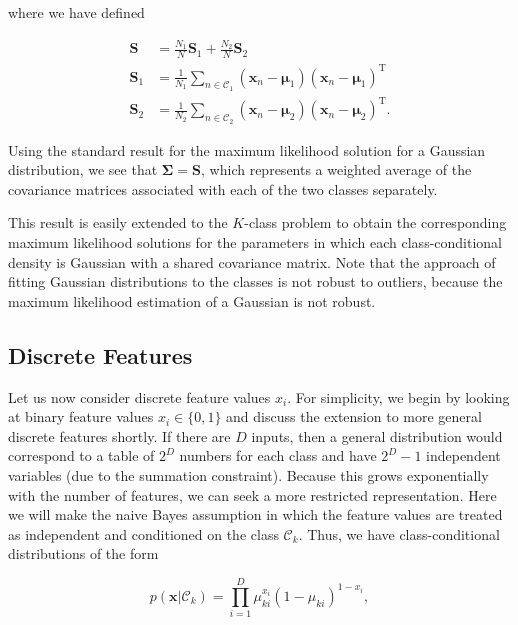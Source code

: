 \documentclass{article}
\begin{document}
where we have defined

\begin{align}
\mathbf{S} &= \frac{N_{1}}{N}\mathbf{S}_{1}+\frac{N_{2}}{N}\mathbf{S}_{2} \tag{5.61}\\ 
\mathbf{S}_{1} &= \frac{1}{N_{1}}\sum_{n\in\mathcal{C}_{1}}(\mathbf{x}_{n}-\boldsymbol{\mu}_{1})(\mathbf{x}_{n}-\boldsymbol{\mu}_{1})^{\mathrm{T}} \tag{5.62}\\ 
\mathbf{S}_{2} &= \frac{1}{N_{2}}\sum_{n\in\mathcal{C}_{2}}(\mathbf{x}_{n}-\boldsymbol{\mu}_{2})(\mathbf{x}_{n}-\boldsymbol{\mu}_{2})^{\mathrm{T}}. \tag{5.63}
\end{align}

Using the standard result for the maximum likelihood solution for a Gaussian distribution, we see that $\boldsymbol{\Sigma}=\mathbf{S}$, which represents a weighted average of the covariance matrices associated with each of the two classes separately.

This result is easily extended to the $K$-class problem to obtain the corresponding maximum likelihood solutions for the parameters in which each class-conditional density is Gaussian with a shared covariance matrix. Note that the approach of fitting Gaussian distributions to the classes is not robust to outliers, because the maximum likelihood estimation of a Gaussian is not robust.

\subsection{Discrete Features}

Let us now consider discrete feature values $x_{i}$. For simplicity, we begin by looking at binary feature values $x_{i}\in\{0,1\}$ and discuss the extension to more general discrete features shortly. If there are $D$ inputs, then a general distribution would correspond to a table of $2^{D}$ numbers for each class and have $2^{D}-1$ independent variables (due to the summation constraint). Because this grows exponentially with the number of features, we can seek a more restricted representation. Here we will make the naive Bayes assumption in which the feature values are treated as independent and conditioned on the class $\mathcal{C}_{k}$. Thus, we have class-conditional distributions of the form

\begin{equation}
p(\mathbf{x}|\mathcal{C}_{k})=\prod_{i=1}^{D}\mu_{ki}^{x_{i}}(1-\mu_{ki})^{1-x_{i}},
\tag{5.64}
\end{equation}
\end{document}

